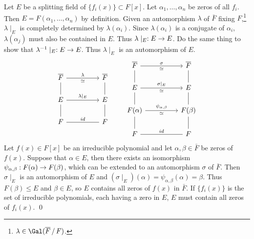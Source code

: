 \pf \note{\mimp} Let \(E\) be a splitting field of \(\{f_i(x)\} \subset F[x]\). Let \(\alpha_1, \dots, \alpha_n\) be zeros of all \(f_i\). Then \(E = F(\alpha_1, \dots, \alpha_n)\) by definition. Given an automorphism \(\lambda\) of \(\bar{F}\) fixing \(F\),\footnote{\(\lambda \in \Gal(\bar{F} \quotient F)\).} \(\lambda \mid_E\) is completely determined by \(\lambda(\alpha_i)\). Since \(\lambda(\alpha_i)\) is a conjugate of \(\alpha_i\), \(\lambda(\alpha_j)\) must also be contained in \(E\). Thus \(\lambda \mid_E : E \rightarrow E\). Do the same thing to show that \(\lambda^{-1}\mid_E : E \rightarrow E\). Thus \(\lambda\mid_E\) is an automorphism of \(E\).
\[
    \begin{tikzcd}
        \bar{F} \arrow[dash]{d} \arrow{rr}{\lambda}[swap]{\simeq} && \bar{F} \arrow[dash]{d} \\
        E \arrow[dash]{d} \arrow{rr}{\lambda\mid_E} && E \arrow[dash]{d} \\
        F \arrow[dash]{rr}{id} && F
    \end{tikzcd}
    \qquad
    \begin{tikzcd}
        \bar{F} \arrow[dash]{d} \arrow{rr}{\sigma}[swap]{\simeq} && \bar{F} \arrow[dash]{d} \\
        E \arrow[dash]{d} \arrow{rr}{\sigma\mid_E}[swap]{\simeq} && E \arrow[dash]{d} \\
        F(\alpha) \arrow[dash]{d} \arrow{rr}{\psi_{\alpha, \beta}}[swap]{\simeq} && F(\beta) \arrow[dash]{d} \\
        F \arrow[dash]{rr}{id} && F
    \end{tikzcd}
\]
\note{\mimpd} Let \(f(x) \in F[x]\) be an irreducible polynomial and let \(\alpha, \beta \in \bar{F}\) be zeros of \(f(x)\). Suppose that \(\alpha \in E\), then there exists an isomorphism \(\psi_{\alpha, \beta} : F(\alpha) \rightarrow F(\beta)\), which can be extended to an automorphism \(\sigma\) of \(\bar{F}\). Then \(\sigma\mid_E\) is an automorphism of \(E\) and \((\sigma\mid_E)(\alpha) = \psi_{\alpha, \beta}(\alpha) = \beta\). Thus \(F(\beta) \leq E\) and \(\beta \in E\), so \(E\) contains all zeros of \(f(x)\) in \(\bar{F}\). If \(\{f_i(x)\}\) is the set of irreducible polynomials, each having a zero in \(E\), \(E\) must contain all zeros of \(f_i(x)\). \qed

\pagebreak
